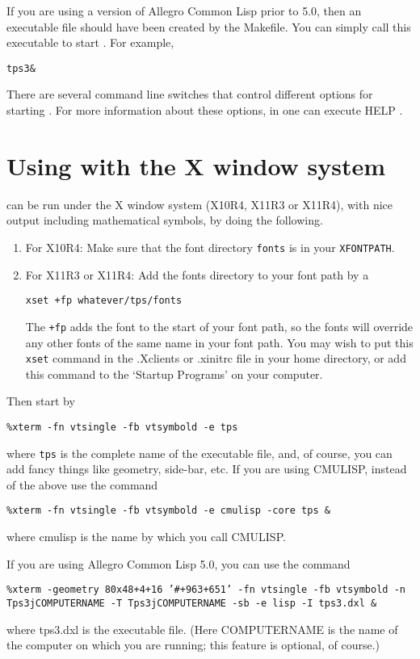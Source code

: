 If you are using a version of Allegro Common Lisp prior to 5.0,
then an executable file should have been created by the Makefile.
You can simply call this executable to start {\TPS}.  For example,
\begin{alltt}
tps3 \&
\end{alltt}

There are several command line switches that control different
options for starting {\TPS}.  For more information about these
options, in {\TPS} one can execute HELP .

\section{Using {\TPS} with the X window system}\label{X}

{\TPS} can be run under the X window system (X10R4, X11R3 or X11R4),
with nice output including mathematical symbols, by doing the
following.

\begin{enumerate}
\item For X10R4: Make sure that
the font directory {\tt fonts}
is in your {\tt XFONTPATH}.

\item For X11R3 or X11R4: Add the fonts directory to your font path by a
\begin{alltt}
{\tt xset +fp whatever/tps/fonts}
\end{alltt}
The {\tt +fp} adds the font to the start
of your font path, so the {\TPS} fonts will override any other fonts of
the same name in your font path. You may wish to put this {\tt xset}
command in the .Xclients or .xinitrc file in your home directory,
or add this command to the `Startup Programs' on your computer.
\end{enumerate}

Then start
{\TPS} by
\begin{alltt}
{\tt \%xterm -fn vtsingle -fb vtsymbold -e tps}
\end{alltt}
where {\tt tps} is the complete name of the
executable file, and, of course, you can add fancy
things like geometry, side-bar, etc.
If you are using CMULISP, instead of the above use the command
\begin{alltt}
{\tt \%xterm -fn vtsingle -fb vtsymbold -e cmulisp -core tps \&}
\end{alltt}
where cmulisp is the name by which you call CMULISP.

If you are using Allegro Common Lisp 5.0, you can use the command
\begin{alltt}
{\tt \%xterm -geometry 80x48+4+16 '\#+963+651' -fn vtsingle -fb vtsymbold  -n Tps3jCOMPUTERNAME -T Tps3jCOMPUTERNAME -sb -e lisp -I tps3.dxl \&}
\end{alltt}
where tps3.dxl is the executable file.
(Here COMPUTERNAME is the name of the computer on which you are running;
this feature is optional, of course.)


